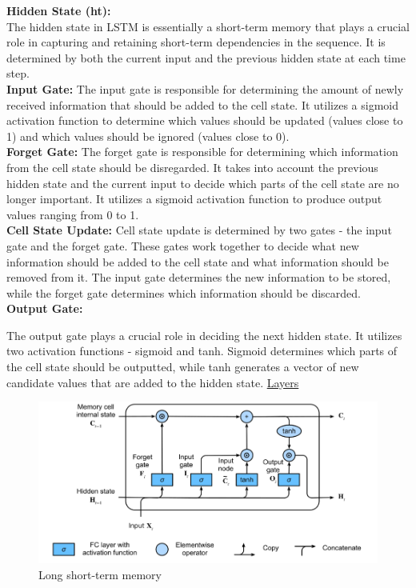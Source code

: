\begin{itemize}
\begin{itemize}
    \textbf{Hidden State (ht):}\\
    
    The hidden state in LSTM is essentially a short-term memory that plays a crucial role in capturing and retaining short-term dependencies in the sequence. It is determined by both the current input and the previous hidden state at each time step.\\
    \textbf{Input Gate: } 
    The input gate is responsible for determining the amount of newly received information that should be added to the cell state. It utilizes a sigmoid activation function to determine which values should be updated (values close to 1) and which values should be ignored (values close to 0).\\
    \textbf{Forget Gate: }
    The forget gate is responsible for determining which information from the cell state should be disregarded. It takes into account the previous hidden state and the current input to decide which parts of the cell state are no longer important. It utilizes a sigmoid activation function to produce output values ranging from 0 to 1.\\
    \textbf{Cell State Update: }
   Cell state update is determined by two gates - the input gate and the forget gate. These gates work together to decide what new information should be added to the cell state and what information should be removed from it. The input gate determines the new information to be stored, while the forget gate determines which information should be discarded.\\
    \textbf{Output Gate:}
    
    The output gate plays a crucial role in deciding the next hidden state. It utilizes two activation functions - sigmoid and tanh. Sigmoid determines which parts of the cell state should be outputted, while tanh generates a vector of new candidate values that are added to the hidden state.
    \href{https://ml-cheatsheet.readthedocs.io/en/latest/layers.html#lstm}{Layers}
    \begin{figure}[H]
        \centering
        \includegraphics[width=0.8\linewidth]{tex/img/LSTM_layer.PNG}
        \caption{Long short-term memory \cite{yu2023popular}}
        \label{fig:LSTM_layer}
    \end{figure}
    \end{itemize}

\end{itemize}

